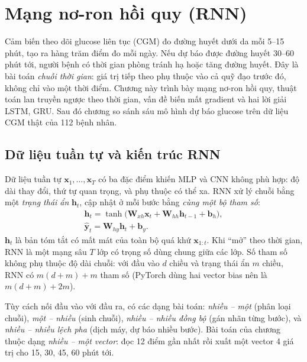 \chapter{Mạng nơ-ron hồi quy (RNN)}
\label{chap:rnn}

Cảm biến theo dõi glucose liên tục (CGM) đo đường huyết dưới da mỗi 5–15 phút, tạo ra hàng trăm điểm đo mỗi ngày. Nếu dự báo được đường huyết 30–60 phút tới, người bệnh có thời gian phòng tránh hạ hoặc tăng đường huyết. Đây là bài toán \emph{chuỗi thời gian}: giá trị tiếp theo phụ thuộc vào cả quỹ đạo trước đó, không chỉ vào một thời điểm. Chương này trình bày mạng nơ-ron hồi quy, thuật toán lan truyền ngược theo thời gian, vấn đề biến mất gradient và hai lời giải LSTM, GRU. Sau đó chương so sánh sáu mô hình dự báo glucose trên dữ liệu CGM thật của 112 bệnh nhân.

\section{Dữ liệu tuần tự và kiến trúc RNN}

Dữ liệu tuần tự $\mathbf x_1,\ldots,\mathbf x_T$ có ba đặc điểm khiến MLP và CNN không phù hợp: độ dài thay đổi, thứ tự quan trọng, và phụ thuộc có thể xa. RNN \cite{elman1990} xử lý chuỗi bằng một \emph{trạng thái ẩn} $\mathbf h_t$, cập nhật ở mỗi bước bằng \emph{cùng một bộ tham số}:
\begin{equation}
\begin{gathered}
\mathbf h_t = \tanh\!\big(\mathbf W_{xh}\mathbf x_t + \mathbf W_{hh}\mathbf h_{t-1} + \mathbf b_h\big), \\
\hat{\mathbf y}_t = \mathbf W_{hy}\mathbf h_t + \mathbf b_y .
\end{gathered}
\label{eq:rnn}
\end{equation}
$\mathbf h_t$ là bản tóm tắt có mất mát của toàn bộ quá khứ $\mathbf x_{1:t}$. Khi ``mở'' theo thời gian, RNN là một mạng sâu $T$ lớp có trọng số dùng chung giữa các lớp. Số tham số không phụ thuộc độ dài chuỗi: với đầu vào $d$ chiều và trạng thái ẩn $m$ chiều, RNN có $m(d+m)+m$ tham số (PyTorch dùng hai vector bias nên là $m(d+m)+2m$).

Tùy cách nối đầu vào với đầu ra, có các dạng bài toán: \emph{nhiều – một} (phân loại chuỗi), \emph{một – nhiều} (sinh chuỗi), \emph{nhiều – nhiều đồng bộ} (gán nhãn từng bước), và \emph{nhiều – nhiều lệch pha} (dịch máy, dự báo nhiều bước). Bài toán của chương thuộc dạng \emph{nhiều – một vector}: đọc 12 điểm gần nhất rồi xuất một vector 4 giá trị cho 15, 30, 45, 60 phút tới.

